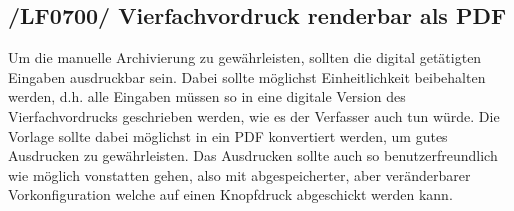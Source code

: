 \subsection{/LF0700/ Vierfachvordruck renderbar als PDF}
Um die manuelle Archivierung zu gewährleisten, sollten die digital getätigten Eingaben ausdruckbar sein. Dabei sollte möglichst Einheitlichkeit beibehalten werden, d.h. alle Eingaben müssen so in eine digitale Version des Vierfachvordrucks geschrieben werden, wie es der Verfasser auch tun würde. Die Vorlage sollte dabei möglichst in ein PDF konvertiert werden, um gutes Ausdrucken zu gewährleisten. Das Ausdrucken sollte auch so benutzerfreundlich wie möglich vonstatten gehen, also mit abgespeicherter, aber veränderbarer Vorkonfiguration welche auf einen Knopfdruck abgeschickt werden kann.